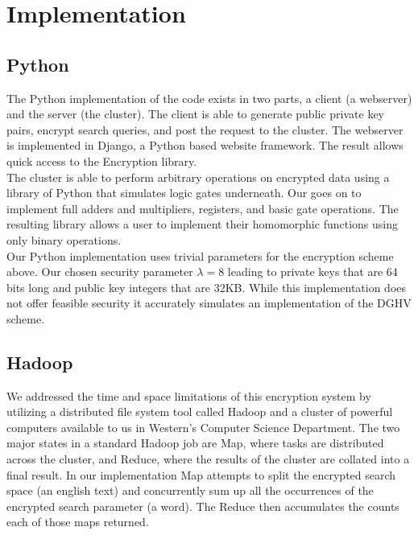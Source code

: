 \documentclass[letterpaper,11pt]{article} %
\begin{document}
\section*{Implementation}
\subsection*{Python}
The Python implementation of the code exists in two parts, a client (a webserver) and the server (the cluster). The client is able to generate public private key pairs, encrypt search queries, and post the request to the cluster. The webserver is implemented in Django, a Python based website framework. The result allows quick access to the Encryption library.\\

The cluster is able to perform arbitrary operations on encrypted data using a library of Python that simulates logic gates underneath. Our goes on to implement full adders and multipliers, registers, and basic gate operations. The resulting library allows a user to implement their homomorphic functions using only binary operations.\\

Our Python implementation uses trivial parameters for the encryption scheme above. Our chosen security parameter $\lambda=8$ leading to private keys that are 64 bits long and public key integers that are 32KB. While this implementation does not offer feasible security it accurately simulates an implementation of the DGHV scheme.


\subsection*{Hadoop}


 We addressed the time and space limitations of this encryption system by utilizing a distributed file system tool called Hadoop and a cluster of powerful computers available to us in Western's Computer Science Department. The two major states in a standard Hadoop job are Map, where tasks are distributed across the cluster, and Reduce, where the results of the cluster are collated into a final result. In our implementation Map attempts to split the encrypted search space (an english text) and concurrently sum up all the occurrences of the encrypted search parameter (a word). The Reduce then accumulates the counts each of those maps returned. \\
\end{document}
